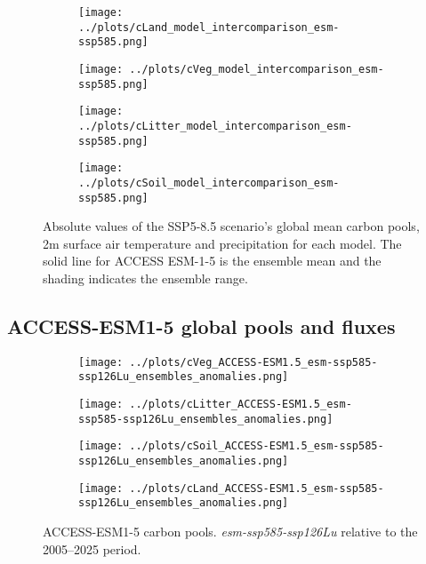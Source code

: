 \documentclass[]{article}
\begin{document}
\begin{figure}[H]
    \centering
    \begin{subfigure}[b]{0.45\linewidth}
        \texttt{[image: ../plots/cLand\_model\_intercomparison\_esm-ssp585.png]}
    \end{subfigure}
    \begin{subfigure}[b]{0.45\linewidth}
        \texttt{[image: ../plots/cVeg\_model\_intercomparison\_esm-ssp585.png]}
    \end{subfigure}
    \begin{subfigure}[b]{0.45\linewidth}
        \texttt{[image: ../plots/cLitter\_model\_intercomparison\_esm-ssp585.png]}
    \end{subfigure}
    \begin{subfigure}[b]{0.45\linewidth}
        \texttt{[image: ../plots/cSoil\_model\_intercomparison\_esm-ssp585.png]}
    \end{subfigure}
    \caption{Absolute values of the SSP5-8.5 scenario's global mean carbon pools, 2m surface air temperature and precipitation for each model. The solid line for ACCESS ESM-1-5 is the ensemble mean and the shading indicates the ensemble range.}
    \label{fig:models_absolute2}
\end{figure}

\subsection{ACCESS-ESM1-5 global pools and fluxes}

\begin{figure}[H]
    \centering
    \begin{subfigure}[b]{0.4\linewidth}
        \texttt{[image: ../plots/cVeg\_ACCESS-ESM1.5\_esm-ssp585-ssp126Lu\_ensembles\_anomalies.png]}
    \end{subfigure}
    \begin{subfigure}[b]{0.4\linewidth}
        \texttt{[image: ../plots/cLitter\_ACCESS-ESM1.5\_esm-ssp585-ssp126Lu\_ensembles\_anomalies.png]}
    \end{subfigure}
    \begin{subfigure}[b]{0.4\linewidth}
        \texttt{[image: ../plots/cSoil\_ACCESS-ESM1.5\_esm-ssp585-ssp126Lu\_ensembles\_anomalies.png]}
    \end{subfigure}
\begin{subfigure}[b]{0.4\linewidth}
        \texttt{[image: ../plots/cLand\_ACCESS-ESM1.5\_esm-ssp585-ssp126Lu\_ensembles\_anomalies.png]}
    \end{subfigure}
    \caption{ACCESS-ESM1-5 carbon pools. \textit{esm-ssp585-ssp126Lu} relative to the 2005–2025 period.}
    \label{fig:access_cpools}
\end{figure}
\end{document}
